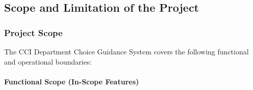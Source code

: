 \documentclass[12pt, a4paper]{article}
\begin{document}
\subsection{Scope and Limitation of the Project}

\subsubsection*{Project Scope}

The CCI Department Choice Guidance System covers the following functional and operational boundaries:

\paragraph{Functional Scope (In-Scope Features)}
\end{document}
